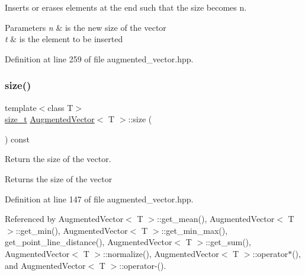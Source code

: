 Inserts or erases elements at the end such that the size becomes n. 


\begin{DoxyParams}{Parameters}
{\em n} & is the new size of the vector \\
\hline
{\em t} & is the element to be inserted \\
\hline
\end{DoxyParams}


Definition at line 259 of file augmented\+\_\+vector.\+hpp.

\mbox{\label{classAugmentedVector_a8360b512194a0eca26dad07eb60a04d1}} 
\subsubsection{\texorpdfstring{size()}{size()}}
{\footnotesize\ttfamily template$<$class T$>$ \\
\hyperlink{tutorial__fpt__2017_2intro_2sixth_2test_8c_a7c94ea6f8948649f8d181ae55911eeaf}{size\+\_\+t} \hyperlink{classAugmentedVector}{Augmented\+Vector}$<$ T $>$\+::size (\begin{DoxyParamCaption}{ }\end{DoxyParamCaption}) const\hspace{0.3cm}{\ttfamily [inline]}}



Return the size of the vector. 

\begin{DoxyReturn}{Returns}
the size of the vector 
\end{DoxyReturn}


Definition at line 147 of file augmented\+\_\+vector.\+hpp.



Referenced by Augmented\+Vector$<$ T $>$\+::get\+\_\+mean(), Augmented\+Vector$<$ T $>$\+::get\+\_\+min(), Augmented\+Vector$<$ T $>$\+::get\+\_\+min\+\_\+max(), get\+\_\+point\+\_\+line\+\_\+distance(), Augmented\+Vector$<$ T $>$\+::get\+\_\+sum(), Augmented\+Vector$<$ T $>$\+::normalize(), Augmented\+Vector$<$ T $>$\+::operator$\ast$(), and Augmented\+Vector$<$ T $>$\+::operator-\/().

